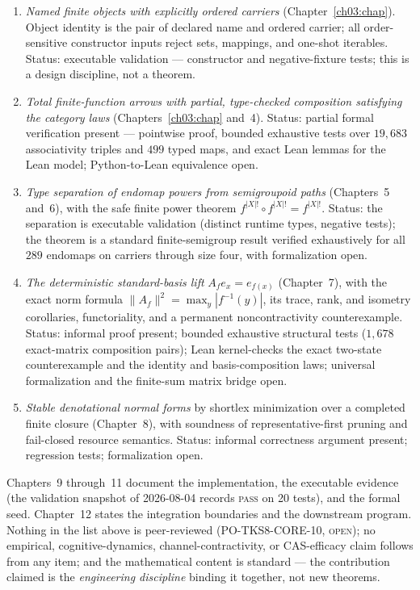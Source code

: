 \begin{enumerate}
\item \emph{Named finite objects with explicitly ordered carriers}
(Chapter~\ref{ch03:chap}). Object identity is the pair of declared name and
ordered carrier; all order-sensitive constructor inputs reject sets,
mappings, and one-shot iterables. Status: executable validation ---
constructor and negative-fixture tests; this is a design discipline, not a
theorem.
\item \emph{Total finite-function arrows with partial, type-checked
composition satisfying the category laws} (Chapters~\ref{ch03:chap} and~4).
Status: partial formal verification present --- pointwise proof, bounded
exhaustive tests over $19{,}683$ associativity triples and $499$ typed maps,
and exact Lean lemmas for the Lean model; Python-to-Lean equivalence open.
\item \emph{Type separation of endomap powers from semigroupoid paths}
(Chapters~5 and~6), with the safe finite power theorem
$f^{|X|!} \circ f^{|X|!} = f^{|X|!}$. Status: the separation is executable
validation (distinct runtime types, negative tests); the theorem is a
standard finite-semigroup result \cite{pin, howie} verified exhaustively for
all $289$ endomaps on carriers through size four, with formalization open.
\item \emph{The deterministic standard-basis lift} $A_f e_x = e_{f(x)}$
(Chapter~7), with the exact norm formula
$\lVert A_f \rVert^2 = \max_{y} |f^{-1}(y)|$, its trace, rank, and isometry
corollaries, functoriality, and a permanent noncontractivity counterexample.
Status: informal proof present; bounded exhaustive structural tests
($1{,}678$ exact-matrix composition pairs); Lean kernel-checks the exact
two-state counterexample and the identity and basis-composition laws;
universal formalization and the finite-sum matrix bridge open.
\item \emph{Stable denotational normal forms} by shortlex minimization over a
completed finite closure (Chapter~8), with soundness of representative-first
pruning and fail-closed resource semantics. Status: informal correctness
argument present; regression tests; formalization open.
\end{enumerate}

Chapters~9 through~11 document the implementation, the executable evidence
(the validation snapshot of 2026-08-04 records \textsc{pass} on 20 tests),
and the formal seed. Chapter~12 states the integration boundaries and the
downstream program. Nothing in the list above is peer-reviewed
(PO-TKS8-CORE-10, \textsc{open}); no empirical, cognitive-dynamics,
channel-contractivity, or CAS-efficacy claim follows from any item; and the
mathematical content is standard --- the contribution claimed is the
\emph{engineering discipline} binding it together, not new theorems.

